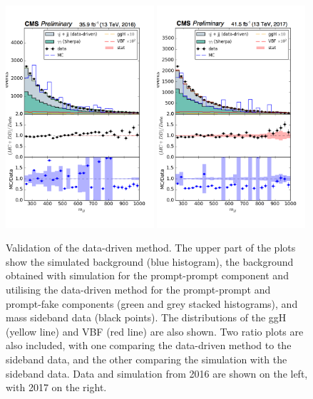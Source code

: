 \begin{figure}
  \centering
  \includegraphics[width=0.49\textwidth]{Figures/Categorisation/DDvalidation_mjj2016.png}
  \includegraphics[width=0.49\textwidth]{Figures/Categorisation/DDvalidation_mjj2017.png}
  \caption{Validation of the data-driven method. 
  The upper part of the plots show the simulated background (blue histogram), 
  the background obtained with simulation for the prompt-prompt component 
  and utilising the data-driven method for the prompt-prompt and prompt-fake components 
  (green and grey stacked histograms),
  and mass sideband data (black points).
  The distributions of the ggH (yellow line) and VBF (red line) are also shown.
  Two ratio plots are also included, with one comparing the data-driven method to the sideband data, 
  and the other comparing the simulation with the sideband data.
  Data and simulation from 2016 are shown on the left, with 2017 on the right.
  }
  \label{fig:cat_DDvalidation}
\end{figure}

